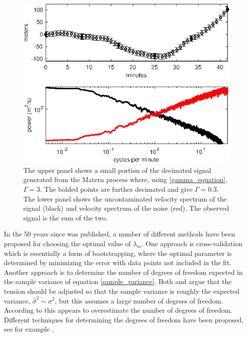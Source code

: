 \documentclass[twocol]{ametsoc}
\begin{document}
\begin{figure}[t]
  \centerline{\includegraphics[width=33pc,angle=0]{synthetic_process_and_spectrum}}
  
  \caption{The upper panel shows a small portion of the decimated signal generated from the Matern process where, using \ref{gamma_equation}, $\Gamma = 3$. The bolded points are further decimated and give $\Gamma=0.3$. The lower panel shows the uncontaminated velocity spectrum of the signal (black) and velocity spectrum of the noise (red). The observed signal is the sum of the two. }
  \label{synthetic_process_and_spectrum}
\end{figure}

In the 50 years since \citet{reinsch1967-nm} was published, a number of different methods have been proposed for choosing the optimal value of $\lambda_m$. One approach is cross-validation \citep{wahba1978-jrss-b,craven1979-nm} which is essentially a form of bootstrapping, where the optimal parameter is determined by minimizing the error with data points not included in the fit. Another approach is to determine the number of degrees of freedom expected in the sample variance of equation \ref{sample_variance}. Both \citet{reinsch1967-nm} and \citet{teanby2007-mg} argue that the tension should be adjusted so that the sample variance is roughly the expected variance, $\hat{\sigma}^2 \sim \sigma^2$, but this assumes a large number of degrees of freedom. According to \citet{wahba1990-siam} this appears to overestimate the number of degrees of freedom. Different techniques for determining the degrees of freedom have been proposed, see for example \citet{cantoni2002-biom}.
\end{document}
